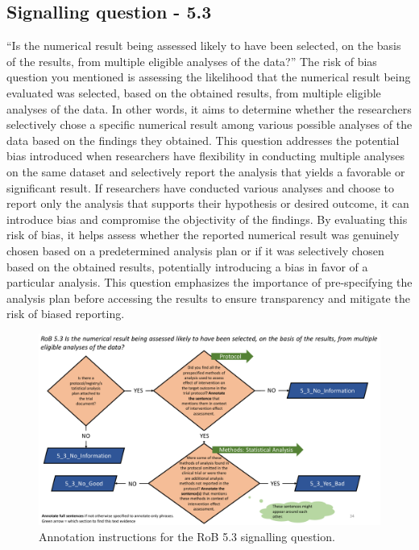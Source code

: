 \documentclass[sn-mathphys,Numbered]{sn-jnl}%
\begin{document}
%
%
%
\subsection*{Signalling question - 5.3 }
\label{subsec:5_3}
%
``Is the numerical result being assessed likely to have been selected, on the basis of the results, from multiple eligible analyses of the data?''
The risk of bias question you mentioned is assessing the likelihood that the numerical result being evaluated was selected, based on the obtained results, from multiple eligible analyses of the data. In other words, it aims to determine whether the researchers selectively chose a specific numerical result among various possible analyses of the data based on the findings they obtained.
This question addresses the potential bias introduced when researchers have flexibility in conducting multiple analyses on the same dataset and selectively report the analysis that yields a favorable or significant result.
If researchers have conducted various analyses and choose to report only the analysis that supports their hypothesis or desired outcome, it can introduce bias and compromise the objectivity of the findings.
By evaluating this risk of bias, it helps assess whether the reported numerical result was genuinely chosen based on a predetermined analysis plan or if it was selectively chosen based on the obtained results, potentially introducing a bias in favor of a particular analysis.
This question emphasizes the importance of pre-specifying the analysis plan before accessing the results to ensure transparency and mitigate the risk of biased reporting.






%
%
%
\begin{figure}[htbp]
    \centering
    \includegraphics[width=\textwidth]{figures/5_3.pdf}
    \caption{Annotation instructions for the RoB 5.3 signalling question.}
    \label{fig:5_3}
\end{figure}
%
%
%
\end{document}
